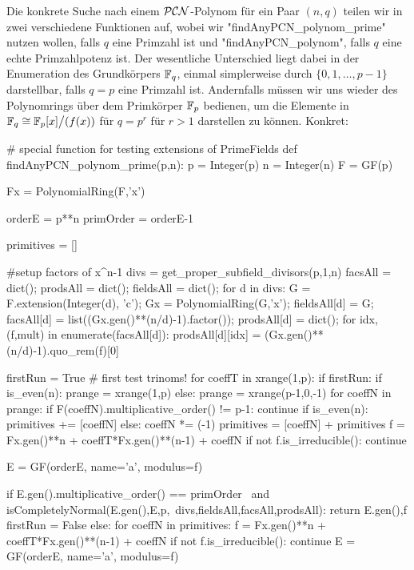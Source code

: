Die konkrete Suche nach einem $\mathcal{PCN}$-Polynom für ein Paar $(n,q)$ 
teilen wir in zwei verschiedene Funktionen auf, wobei wir
"findAnyPCN_polynom_prime" nutzen wollen, falls $q$ eine Primzahl ist und
"findAnyPCN_polynom", falls $q$ eine echte Primzahlpotenz ist. Der wesentliche
Unterschied liegt dabei in der Enumeration des Grundkörpers $\mathbb{F}_q$, einmal
simplerweise durch $\{0,1,\ldots,p-1\}$ darstellbar, falls $q = p$ eine
Primzahl ist. Andernfalls müssen wir uns wieder des Polynomrings
über dem Primkörper $\mathbb{F}_p$ bedienen, um die Elemente in
$\mathbb{F}_q \cong \mathbb{F}_p[x]\big/(f(x))$ für $q=p^r$ für $r>1$ darstellen zu können.
Konkret:

\begin{sagecode}[caption={Aus \url{../Sage/findAnyPCN_trinom.spyx}},
  label=lst:findAnyPCN_polynom_prime]
# special function for testing extensions of PrimeFields
def findAnyPCN_polynom_prime(p,n):
    p = Integer(p)
    n = Integer(n)
    F = GF(p)
    
    Fx = PolynomialRing(F,'x')
    
    orderE = p**n
    primOrder = orderE-1
    
    primitives = []

    #setup factors of x^n-1
    divs = get_proper_subfield_divisors(p,1,n)
    facsAll = dict();
    prodsAll = dict();
    fieldsAll = dict();
    for d in divs:
        G = F.extension(Integer(d), 'c');
        Gx = PolynomialRing(G,'x');
        fieldsAll[d] = G;
        facsAll[d] = list((Gx.gen()**(n/d)-1).factor());
        prodsAll[d] = dict();
        for idx,(f,mult) in enumerate(facsAll[d]):
            prodsAll[d][idx] = (Gx.gen()**(n/d)-1).quo_rem(f)[0]

    firstRun = True
    # first test trinoms!
    for coeffT in xrange(1,p):
        if firstRun:
            if is_even(n):
                prange = xrange(1,p)
            else:
                prange = xrange(p-1,0,-1)
            for coeffN in prange:
                if F(coeffN).multiplicative_order() != p-1: continue
                if is_even(n):
                    primitives += [coeffN]
                else:
                    coeffN *= (-1)
                    primitives = [coeffN] + primitives
                f = Fx.gen()**n + coeffT*Fx.gen()**(n-1) + coeffN
                if not f.is_irreducible(): continue
                
                E = GF(orderE, name='a', modulus=f)

                if E.gen().multiplicative_order() == primOrder \
                        and isCompletelyNormal(E.gen(),E,p,\
                            divs,fieldsAll,facsAll,prodsAll):
                    return E.gen(),f
            firstRun = False
        else:
            for coeffN in primitives:
                f = Fx.gen()**n + coeffT*Fx.gen()**(n-1) + coeffN
                if not f.is_irreducible(): continue
                E = GF(orderE, name='a', modulus=f)


\end{sagecode}
